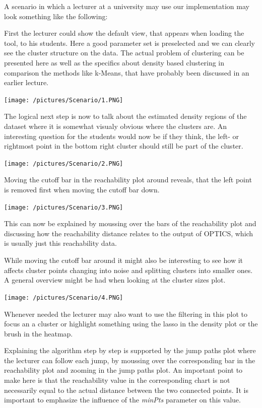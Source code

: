 \documentclass{vgtc} %
\begin{document}
A scenario in which a lecturer at a university may use our implementation may look something like the following:

First the lecturer could show the default view, that appears when loading the tool, to his students. Here a good parameter set is preselected and we can clearly see the cluster structure on the data. The actual problem of clustering can be presented here as well as the specifics about density based clustering in comparison the methods like k-Means, that have probably been discussed in an earlier lecture.

\noindent
\texttt{[image: /pictures/Scenario/1.PNG]}

The logical next step is now to talk about the estimated density regions of the dataset where it is somewhat visualy obvious where the clusters are. An interesting question for the students would now be if they think, the left- or rightmost point in the bottom right cluster should still be part of the cluster.

\noindent
\texttt{[image: /pictures/Scenario/2.PNG]}

Moving the cutoff bar in the reachability plot around reveals, that the left point is removed first when moving the cutoff bar down.

\noindent
\texttt{[image: /pictures/Scenario/3.PNG]}

This can now be explained by moussing over the bars of the reachability plot and discussing how the reachability distance relates to the output of OPTICS, which is usually just this reachability data.

While moving the cutoff bar around it might also be interesting to see how it affects cluster points changing into noise and splitting clusters into smaller ones. A general overview might be had when looking at the cluster sizes plot.

\noindent
\texttt{[image: /pictures/Scenario/4.PNG]}

Whenever needed the lecturer may also want to use the filtering in this plot to focus an a cluster or highlight something using the lasso in the density plot or the brush in the heatmap.

Explaining the algorithm step by step is supported by the jump paths plot where the lecturer can follow each jump, by moussing over the corresponding bar in the reachability plot and zooming in the jump paths plot. An important point to make here is that the reachability value in the corresponding chart is not necessarily equal to the actual distance between the two connected points. It is important to emphasize the influence of the \emph{minPts} parameter on this value.
\end{document}
